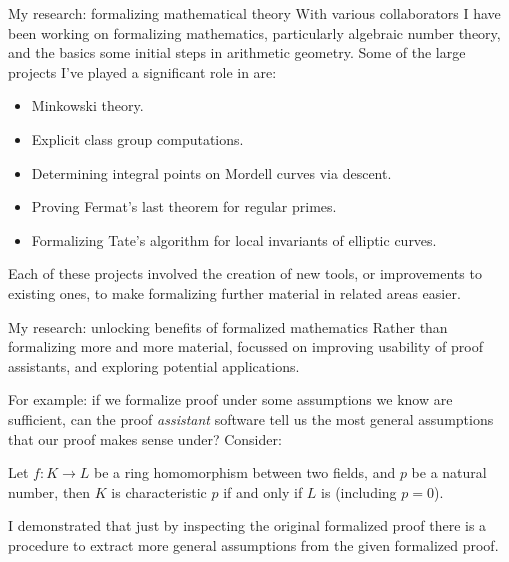 \documentclass{beamer}
\theoremstyle{plain}
\begin{document}
\begin{frame}{My research: formalizing mathematical theory}
    With various collaborators I have been working on formalizing mathematics, particularly algebraic number theory, and the basics some initial steps in arithmetic geometry.
    Some of the large projects I've played a significant role in are:
    \begin{itemize}
        \item Minkowski theory.
        \item Explicit class group computations.
        \item Determining integral points on Mordell curves via descent.
        \item Proving Fermat's last theorem for regular primes.
        \item Formalizing Tate's algorithm for local invariants of elliptic curves.
    \end{itemize}

    Each of these projects involved the creation of new tools, or improvements to existing ones, to make formalizing further material in related areas easier.
\end{frame}

\begin{frame}{My research: unlocking benefits of formalized mathematics}
    Rather than formalizing more and more material, focussed on improving usability of proof assistants, and exploring potential applications.

    For example: if we formalize proof under some assumptions we know are sufficient, can the proof \emph{assistant} software tell us the most general assumptions that our proof makes sense under?
\pause
    Consider:
    \begin{lemma}
        Let $f\colon K\to L$ be a ring homomorphism between two fields, and $p$ be a natural number, then $K$ is characteristic $p$ if and only if $L$ is (including $p= 0$).
    \end{lemma}
\pause
    I demonstrated that just by inspecting the original formalized proof there is a procedure to extract more general assumptions from the given formalized proof.

\end{frame}
\end{document}
